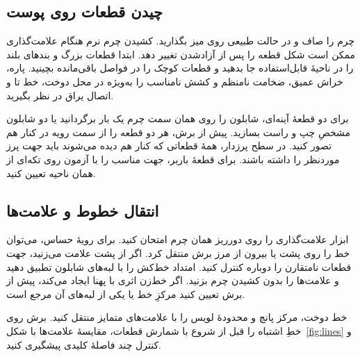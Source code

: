 \subsection{چیدن قطعات روی پوست}

چرم را صاف و در حالت طبیعی روی میز بگذارید. کشیدن چرم نرم هنگام علامت‌گذاری ممکن است شکل قطعه را پس از آزادشدن تغییر دهد. ابتدا قطعات بزرگ و بندهای بلند را در ناحیۀ قابل‌استفاده جا بدهید و قطعات کوچک را در فواصل باقی‌مانده بچینید. پاره، خراش عمیق، ضخامت نامنظم و کشش نامناسب را به‌ویژه در محل دوخت، خط تا و اتصال یراق در نظر بگیرید.

برای دو قطعۀ آینه‌ای، شابلون را روی همان سمت چرم یک بار برگردانید یا دو شابلون مشخصِ چپ و راست بسازید. پیش از برش، هر دو قطعه را از سمت رویه در کنار هم تصور کنید. در سطح پرزدار، همۀ قطعاتی که کنار هم دیده می‌شوند باید جهت پرز موردنظر را داشته باشند. برای قطعۀ باربر، جهت مناسب را با آزمون روی تکه‌ای از همان ناحیه تعیین کنید.

\subsection{انتقال خطوط و علامت‌ها}

ابزار علامت‌گذاری را روی دورریز همان چرم امتحان کنید. برای رویۀ حساس، می‌توان خط را روی پشت یا بیرون از مرز برش منتقل کرد. اگر از پشت علامت می‌زنید، جهت قطعات نامتقارن را دوباره کنترل کنید. امتداد خط‌کش را با لبه‌های شابلون تطبیق دهید و علامت‌ها را بدون کشیدن چرم بزنید. اگر خط‌زن اثری با پهنا ایجاد می‌کند، پیش از برش تعیین کنید مرکزِ خط یا یکی از لبه‌های آن مرجع است.

خط دوخت، مرکز پانچ و محدودۀ لویس را با علامت‌های متمایز منتقل کنید. برش روی خطِ اشتباه را قبل از شروع با شمارش قطعات، مقایسۀ علامت‌ها با شکل~\ref{fig:lines} و کنترل چند فاصلۀ کلیدی پیشگیری کنید.
